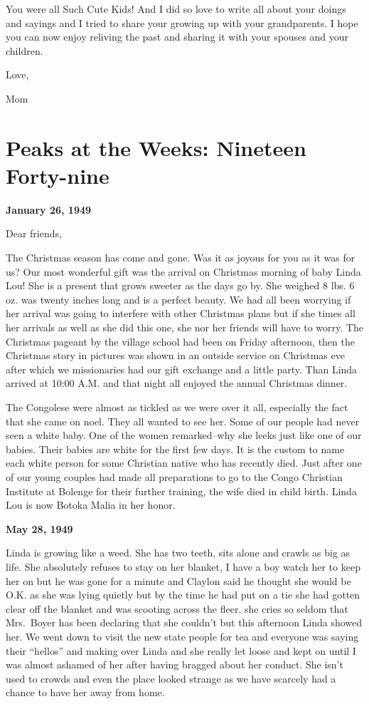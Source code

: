 \documentclass[]{book}
\begin{document}
You were all Such Cute Kids! And I did so love to write all about your doings and sayings and I tried to share your growing up with your grandparents. I hope you can now enjoy reliving the past and sharing it with your spouses and your children.

Love,

Mom

\hypertarget{peaks-at-the-weeks-nineteen-forty-nine}{%
\chapter{Peaks at the Weeks: Nineteen Forty-nine}\label{peaks-at-the-weeks-nineteen-forty-nine}}

\textbf{January 26, 1949}

Dear friends,

The Christmas season has come and gone. Was it as joyous for you as it was for us? Our most wonderful gift was the arrival on Christmas morning of baby Linda Lou! She is a present that grows sweeter as the days go by. She weighed 8 lbs. 6 oz. was twenty inches long and is a perfect beauty. We had all been worrying if her arrival was going to interfere with other Christmas plans but if she times all her arrivals as well as she did this one, she nor her friends will have to worry. The Christmas pageant by the village school had been on Friday afternoon, then the Christmas story in pictures was shown in an outside service on Christmas eve after which we missionaries had our gift exchange and a little party. Than Linda arrived at 10:00 A.M. and that night all enjoyed the annual Christmas dinner.

The Congolese were almost as tickled as we were over it all, especially the fact that she came on noel. They all wanted to see her. Some of our people had never seen a white baby. One of the women remarked--why she leeks just like one of our babies. Their babies are white for the first few days. It is the custom to name each white person for some Christian native who has recently died. Just after one of our young couples had made all preparations to go to the Congo Christian Institute at Bolenge for their further training, the wife died in child birth. Linda Lou is now Botoka Malia in her honor.

\textbf{May 28, 1949}

Linda is growing like a weed. She has two teeth, sits alone and crawls as big as life. She absolutely refuses to stay on her blanket, I have a boy watch her to keep her on but he was gone for a minute and Claylon said he thought she would be O.K. as she was lying quietly but by the time he had put on a tie she
had gotten clear off the blanket and was scooting across the fleer. she cries so seldom that Mrs.~Boyer has been declaring that she couldn't but this afternoon Linda showed her. We went down to visit the new state people for tea and everyone was saying their ``hellos'' and making over Linda and she really let loose and kept on until I was almost ashamed of her after having bragged about her conduct. She isn't used to crowds and even the place looked strange as we have scarcely had a chance to have her away from home.
\end{document}
